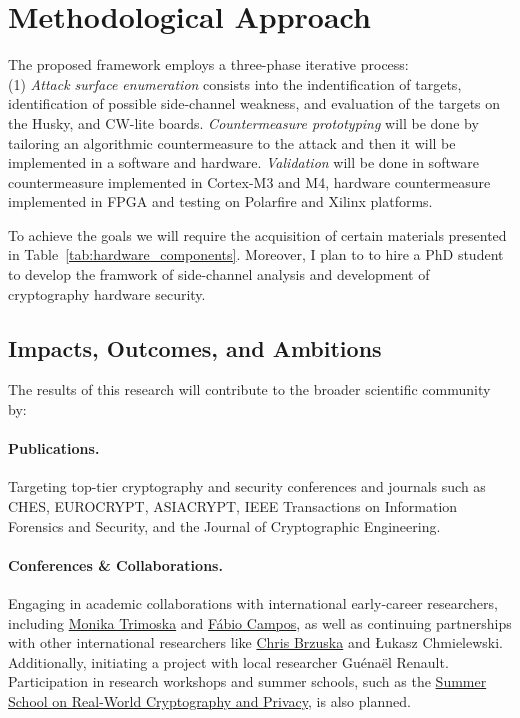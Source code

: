 \documentclass[11pt, a4paper]{article}
\begin{document}
\section*{Methodological Approach}
The proposed framework employs a three-phase iterative process:~\\
(1) \textit{Attack surface enumeration} consists into the indentification of targets, identification of possible 
side-channel weakness, and evaluation of the targets on the Husky, and CW-lite boards. 
\textit{Countermeasure prototyping} will be done by tailoring an algorithmic countermeasure to the 
attack and then it will be implemented in a software and hardware. 
\textit{Validation} will be done in software countermeasure implemented in Cortex-M3 and M4, 
hardware countermeasure implemented in FPGA and testing on Polarfire and Xilinx platforms.


To achieve the goals we will require the acquisition of certain materials presented in 
Table~\ref{tab:hardware_components}. Moreover, I plan to to hire a PhD student to 
develop the framwork of side-channel analysis and development of 
cryptography hardware security.


\subsection*{Impacts, Outcomes, and Ambitions}

The results of this research will contribute to the broader scientific community by:

\paragraph{Publications.} Targeting top-tier cryptography and security conferences and journals such as 
CHES, EUROCRYPT, ASIACRYPT, IEEE Transactions on Information Forensics and Security, and the 
Journal of Cryptographic Engineering.

\paragraph{Conferences \& Collaborations.} Engaging in academic collaborations with international 
early-career researchers, including \href{https://mtrimoska.com/}{Monika Trimoska} and 
\href{https://www.sopmac.de/index.html}{Fábio Campos}, as well as continuing partnerships 
with other international researchers like \href{https://research.aalto.fi/en/persons/chris-brzuska}{Chris Brzuska} 
and Łukasz Chmielewski. Additionally, initiating a project with local researcher Guénaël Renault. 
Participation in research workshops and summer schools, such as the 
\href{https://summerschool-croatia.cs.ru.nl/}{Summer School on Real-World Cryptography and Privacy}, 
is also planned.
\end{document}
